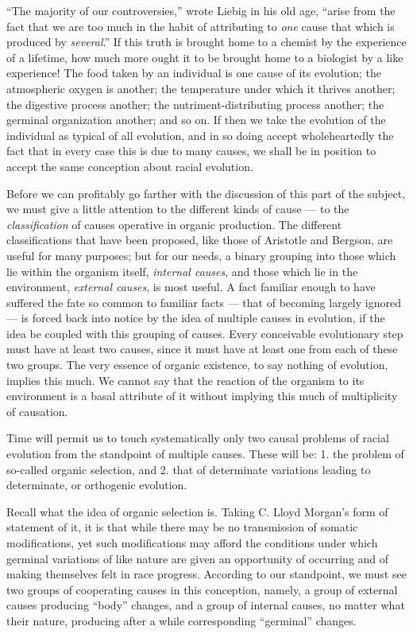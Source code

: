 \documentclass[a4paper, 11pt, oneside, polutonikogreek, english]{article}
\begin{document}
``The majority of our controversies,'' wrote Liebig in his old age, ``arise from the fact that we are too much in the habit of attributing to \emph{one} cause that which is produced by \emph{several}.'' If this truth is brought home to a chemist by the experience of a lifetime, how much more ought it to be brought home to a biologist by a like experience! The food taken by an individual is one cause of its evolution; the atmospheric oxygen is another; the temperature under which it thrives another; the digestive process another; the nutriment-distributing process another; the germinal organization another; and so on. If then we take the evolution of the individual as typical of all evolution, and in so doing accept wholeheartedly the fact that in every case this is due to many causes, we shall be in position to accept the same conception about racial evolution.

Before we can profitably go farther with the discussion of this part of the subject, we must give a little attention to the different kinds of cause --- to the \emph{classification} of causes operative in organic production. The different classifications that have been proposed, like those of Aristotle and Bergson, are useful for many purposes; but for our needs, a binary grouping into those which lie within the organism itself, \emph{internal causes}, and those which lie in the environment, \emph{external causes}, is most useful. A fact familiar enough to have suffered the fate so common to familiar facts --- that of becoming largely ignored --- is forced back into notice by the idea of multiple causes in evolution, if the idea be coupled with this grouping of causes. Every conceivable evolutionary step must have at least two causes, since it must have at least one from each of these two groups. The very essence of organic existence, to say nothing of evolution, implies this much. We cannot say that the reaction of the organism to its environment is a basal attribute of it without implying this much of multiplicity of causation.

Time will permit us to touch systematically only two causal problems of racial evolution from the standpoint of multiple causes. These will be: 1. the problem of so-called organic selection, and 2. that of determinate variations leading to determinate, or orthogenic evolution.

Recall what the idea of organic selection is. Taking C. Lloyd Morgan's form of statement of it, it is that while there may be no transmission of somatic modifications, yet such modifications may afford the conditions under which germinal variations of like nature are given an opportunity of occurring and of making themselves felt in race progress. According to our standpoint, we must see two groups of cooperating causes in this conception, namely, a group of external causes producing ``body'' changes, and a group of internal causes, no matter what their nature, producing after a while corresponding ``germinal'' changes.
\end{document}
